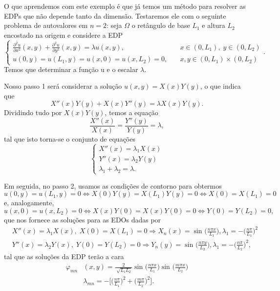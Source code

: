 \documentclass[../pde_notes.tex]{subfiles}
\begin{document}
O que aprendemos com este exemplo é que já temos um método para resolver as EDPs que não depende tanto da dimensão. Testaremos ele com o seguinte problema de autovalores em \(n=2\): seja \(\Omega \) o retângulo de base \(L_1\) e altura \(L_2\) encostado na origem e considere a EDP
\[
	\left\{\begin{array}{ll}
		\frac{\partial^{2}u}{\partial x^{2}}(x,y) + \frac{\partial^{2}u}{\partial y^{2}}(x,y) = \lambda u(x, y), & \quad x\in(0, L_1),\; y\in(0, L_2)    \\
		u(0, y) = u(L_1, y) = u(x, 0) = u(x, L_2) = 0,                                                           & \quad x, y\in (0, L_1)\times (0, L_2)
	\end{array}\right..
\]
Temos que determinar a função u e o escalar \(\lambda \).

Nosso passo 1 será considerar a solução \(u(x, y) = X(x) Y(y)\), o que indica que
\[
	X''(x)Y(y) + X(x)Y''(y) = \lambda X(x)Y(y).
\]
Dividindo tudo por \(X(x)Y(y)\), temos a equação
\[
	\frac{X''(x)}{X(x)} = \frac{Y''(y)}{Y(y)} = \lambda ,
\]
tal que isto torna-se o conjunto de equações
\[
	\left\{\begin{array}{ll}
		X''(x) = \lambda_1 X(x) \\
		Y''(x) = \lambda_2 Y(y) \\
		\lambda_1 + \lambda_2 = \lambda .
	\end{array}\right.
\]

Em seguida, no passo 2, usamos as condições de contorno para obtermos
\[
	u(0, y) = u(L_1, y) = 0 \Leftrightarrow X(0)Y(y) = X(L_1)Y(y) = 0 \Leftrightarrow X(0) = X(L_1) = 0
\]
e, analogamente,
\[
	u(x, 0) = u(x, L_2) = 0 \Leftrightarrow X(x)Y(0) = X(x)Y(0) = 0 \Leftrightarrow Y(0) = Y(L_2) = 0,
\]
que nos fornece as soluções para as EDOs dadas por
\begin{align*}
	 & X''(x) = \lambda_1 X(x),\; X(0) = X(L_1) = 0 \Rightarrow X_{n}(x) = \sin^{}{\biggl(\frac{n\pi x}{L_1}\biggr)}, \lambda_1 = -\biggl(\frac{n\pi }{L_1}\biggr)^{2}  \\
	 & Y''(x) = \lambda_2 Y(x),\; Y(0) = Y(L_2) = 0 \Rightarrow Y_{n}(y) = \sin^{}{\biggl(\frac{n\pi y}{L_2}\biggr)}, \lambda_1 = -\biggl(\frac{n\pi }{L_2}\biggr)^{2},
\end{align*}
tal que as soluções da EDP terão a cara
\begin{align*}
	\varphi_{mn} & (x,y) = \frac{2}{\sqrt[]{L_1L_2}}\sin^{}{\biggl(\frac{n\pi x}{L_1}\biggr)}\sin^{}{\biggl(\frac{m\pi x}{L_2}\biggr)} \\
	             & \lambda_{mn}= -\biggl[\biggl(\frac{n\pi }{L_1}\biggr)^{2}+\biggl(\frac{m\pi }{L_2}\biggr)^{2}\biggr].
\end{align*}
\end{document}
